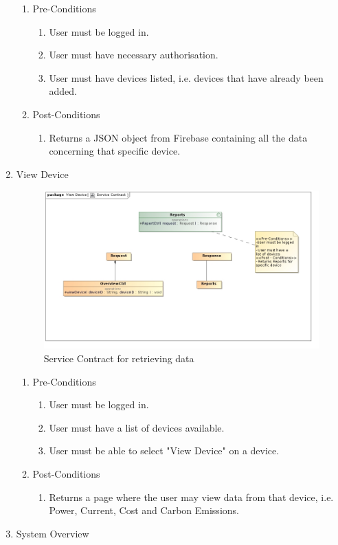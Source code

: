 \documentclass{article}
\begin{document}
\begin{enumerate}
		\begin{enumerate}
			\item  Pre-Conditions
			\begin{enumerate}
				\item	User must be logged in.
				\item	User must have necessary authorisation.
				\item	User must have devices listed, i.e. devices that have already been added.
			\end{enumerate}
			\item  Post-Conditions		
			\begin{enumerate}
				\item	Returns a JSON object from Firebase containing all the data concerning that specific device.
			\end{enumerate}
		\end{enumerate}
		\newpage
		\item	View Device
		
		\begin{figure}[H]
			\includegraphics[width=\textwidth]{images/ReportsServiceContract.jpg}
			\caption{Service Contract for retrieving data \label{overflow}}
		\end{figure}
		
		\begin{enumerate}
			\item  Pre-Conditions
			\begin{enumerate}
				\item	User must be logged in.
				\item	User must have a list of devices available.
				\item	User must be able to select "View Device" on a device.
			\end{enumerate}
			\item  Post-Conditions		
			\begin{enumerate}
				\item	Returns a page where the user may view data from that device, i.e. Power, Current, Cost and Carbon 
				Emissions.
			\end{enumerate}
		\end{enumerate}
		\newpage
		\item	System Overview
		

\end{enumerate}
\end{document}
